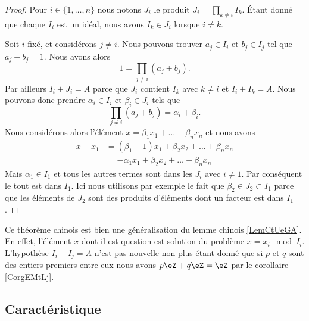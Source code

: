 \begin{proof}
    Pour \( i\in\{ 1,\ldots,n \}\) nous notons \( J_i\) le produit \( J_i=\prod_{k\neq i}I_k\). Étant donné que chaque \( I_i\) est un idéal, nous avons \( I_k\in J_i\) lorsque \( i\neq k\).

    Soit \( i\) fixé, et considérons \( j\neq i\). Nous pouvons trouver \( a_j\in I_i\) et \( b_j\in I_j\) tel que \( a_j+b_j=1\). Nous avons alors
    \begin{equation}
        1=\prod_{j\neq i}(a_j+b_j).
    \end{equation}
    Par ailleurs \( I_i+J_i=A\) parce que \( J_i\) contient \( I_k\) avec \( k\neq i\) et \( I_i+I_k=A\). Nous pouvons donc prendre \( \alpha_i\in I_i\) et \( \beta_i\in J_i\) tels que
    \begin{equation}
        \prod_{j\neq i}(a_j+b_j)=\alpha_i+\beta_i.
    \end{equation}
    Nous considérons alors l'élément \( x=\beta_1x_1+\ldots+\beta_nx_n\) et nous avons
    \begin{subequations}
        \begin{align}
            x-x_1&=(\beta_1-1)x_1+\beta_2x_2+\ldots+\beta_nx_n\\
            &=-\alpha_1x_1+\beta_2x_2+\ldots+\beta_nx_n
        \end{align}
    \end{subequations}
    Mais \( \alpha_1\in I_1\) et tous les autres termes sont dans les \( J_i\) avec \( i\neq 1\). Par conséquent le tout est dans \( I_1\). Ici nous utilisons par exemple le fait que \( \beta_2\in J_2\subset I_1\) parce que les éléments de \( J_2\) sont des produits d'éléments dont un facteur est dans \( I_1\).
\end{proof}

\begin{remark}
    Ce théorème chinois est bien une généralisation du lemme chinois \ref{LemCtUeGA}. En effet, l'élément \( x\) dont il est question est solution du problème \( x=x_i\mod I_i\). L'hypothèse \( I_i+I_j=A\) n'est pas nouvelle non plus étant donné que si \( p\) et \( q\) sont des entiers premiers entre eux nous avons \( p\eZ+q\eZ=\eZ\) par le corollaire \ref{CorgEMtLj}.
\end{remark}

\subsection{Caractéristique}


